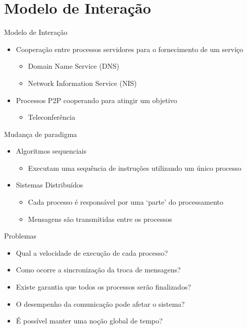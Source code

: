 \documentclass[aspectratio=169,
				xcolor=table]{beamer}
\begin{document}
	\section{Modelo de Interação}	
	\begin{frame}{Modelo de Interação}
		\begin{itemize}
			\item Cooperação entre processos servidores para o fornecimento de um serviço 
			\begin{itemize}
				\item Domain Name Service (DNS)
				\item Network Information Service (NIS)
			\end{itemize}
			\vspace{1em}
			\item Processos P2P cooperando para atingir um objetivo
			\begin{itemize}
				\item Teleconferência
			\end{itemize}
		\end{itemize}
	\end{frame}
	
	\begin{frame}{Mudança de paradigma}
		\begin{itemize}
			\item Algoritmos sequenciais
			\begin{itemize}
				\item Executam uma sequência de instruções utilizando um único processo
			\end{itemize}
			\vspace{1em}
			\item Sistemas Distribuídos
			\begin{itemize}
				\item Cada processo é responsável por uma ‘parte’ do processamento
				\item Mensagens são transmitidas entre os processos
			\end{itemize}
		\end{itemize}
	\end{frame}
	
	\begin{frame}{Problemas}
		\begin{itemize}
			\item Qual a velocidade de execução de cada processo?
			\vspace{1em}
			\item Como ocorre a sincronização da troca de mensagens?
			\vspace{1em}
			\item Existe garantia que todos os processos serão finalizados?
			\vspace{1em}
			\item O desempenho da comunicação pode afetar o sistema?
			\vspace{1em}
			\item É possível manter uma noção global de tempo?
		\end{itemize}
	\end{frame}
	
\end{document}
